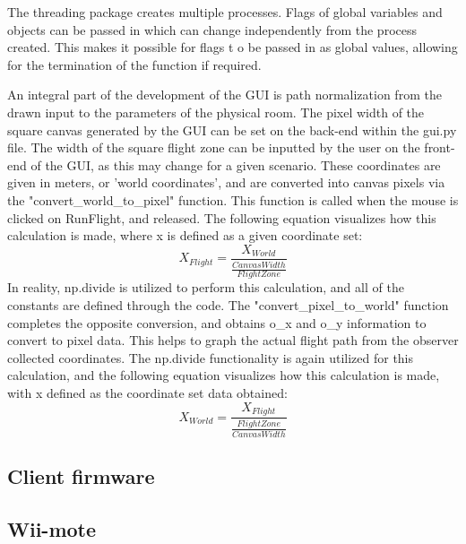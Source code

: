 \documentclass[conf]{new-aiaa}
\begin{document}
        The threading package creates multiple processes. Flags of global variables and objects can be passed in which can change independently from the process created. This makes it possible for flags t o be passed in as global values, allowing for the termination of the function if required. 
        
        
        An integral part of the development of the GUI is path normalization from the drawn input to the parameters of the physical room. The pixel width of the square canvas generated by the GUI can be set on the back-end within the gui.py file. The width of the square flight zone can be inputted by the user on the front-end of the GUI, as this may change for a given scenario. These coordinates are given in meters, or 'world coordinates', and are converted into canvas pixels via the "convert\_world\_to\_pixel" function. This function is called when the mouse is clicked on RunFlight, and released. The following equation visualizes how this calculation is made, where x is defined as a given coordinate set:
        \begin{equation}
            X_{Flight} = \frac{X_{World}}{\frac{Canvas Width}{Flight Zone}}
        \end{equation}
        In reality, np.divide is utilized to perform this calculation, and all of the constants are defined through the code. The "convert\_pixel\_to\_world" function completes the opposite conversion, and obtains o\_x and o\_y information to convert to pixel data. This helps to graph the actual flight path from the observer collected coordinates. The np.divide functionality is again utilized for this calculation, and the following equation visualizes how this calculation is made, with x defined as the coordinate set data obtained:
        \begin{equation}
            X_{World} = \frac{X_{Flight}}{\frac{Flight Zone}{Canvas Width}}
        \end{equation}
        
    
    \subsection{Client firmware}
    
    \subsection{Wii-mote}
\end{document}
